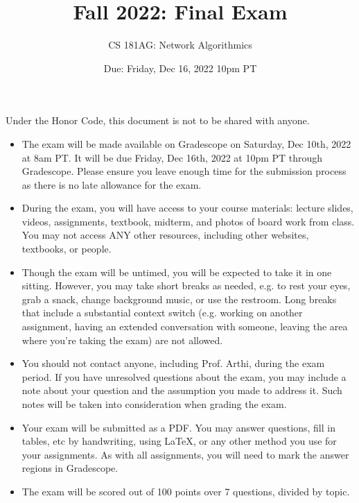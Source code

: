 \documentclass[10pt]{article}
\date{Due: Friday, Dec 16, 2022 10pm PT}
\begin{document}
 
\title{Fall 2022: Final Exam}
\author{
CS 181AG: Network Algorithmics}
\maketitle

Under the Honor Code, this document is not to be shared with anyone.

\begin{itemize}

\item The exam will be made available on Gradescope on Saturday, Dec 10th, 2022 at 8am PT. It will be due Friday, Dec 16th, 2022 at 10pm PT through Gradescope. Please ensure you leave enough time for the submission process as there is no late allowance for the exam.

\item During the exam, you will have access to your course materials: lecture slides, videos, assignments, textbook, midterm, and photos of board work from class. You may not access ANY other resources, including other websites, textbooks, or people.

\item Though the exam will be untimed, you will be expected to take it in one sitting. However, you may
take short breaks as needed, e.g. to rest your eyes, grab a snack, change background music, or use the
restroom. Long breaks that include a substantial context switch (e.g. working on another assignment,
having an extended conversation with someone, leaving the area where you’re taking the exam) are
not allowed.

\item You should not contact anyone, including Prof. Arthi, during the exam period. If you have unresolved
questions about the exam, you may include a note about your question and the assumption you made
to address it. Such notes will be taken into consideration when grading the exam.

\item Your exam will be submitted as a PDF. You may answer questions, fill in tables, etc by handwriting, using LaTeX, or any other method you use for your assignments. As with all assignments, you will need to mark the answer regions in Gradescope.

\item The exam will be scored out of 100 points over 7 questions, divided by topic.

\end{itemize}
\end{document}
